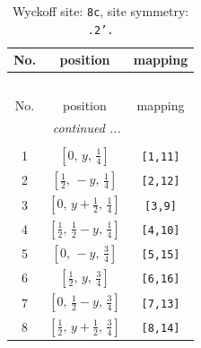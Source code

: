 \documentclass[fleqn,8pt]{jsarticle}
\begin{document}
\begin{longtable}{ccc}
\caption{Wyckoff site: {\tt 8c}, site symmetry: {\tt .2'.}}
 \\
 \hline \hline
No. & position & mapping \\ \hline \endfirsthead

\multicolumn{2}{l}{\tablename\ \thetable{}} \\
 \hline \hline
No. & position & mapping \\ \hline \endhead

 \hline \hline
\multicolumn{2}{r}{\footnotesize\it continued ...} \\ \endfoot

 \hline \hline
\multicolumn{2}{r}{} \\ \endlastfoot

1 & $\left[ 0,\, y,\, \frac{1}{4} \right]$ & {\tt [1,11]} \\ \hline
2 & $\left[ \frac{1}{2},\, - y,\, \frac{1}{4} \right]$ & {\tt [2,12]} \\ \hline
3 & $\left[ 0,\, y + \frac{1}{2},\, \frac{1}{4} \right]$ & {\tt [3,9]} \\ \hline
4 & $\left[ \frac{1}{2},\, \frac{1}{2} - y,\, \frac{1}{4} \right]$ & {\tt [4,10]} \\ \hline
5 & $\left[ 0,\, - y,\, \frac{3}{4} \right]$ & {\tt [5,15]} \\ \hline
6 & $\left[ \frac{1}{2},\, y,\, \frac{3}{4} \right]$ & {\tt [6,16]} \\ \hline
7 & $\left[ 0,\, \frac{1}{2} - y,\, \frac{3}{4} \right]$ & {\tt [7,13]} \\ \hline
8 & $\left[ \frac{1}{2},\, y + \frac{1}{2},\, \frac{3}{4} \right]$ & {\tt [8,14]} \\
\end{longtable}
\renewcommand{\arraystretch}{1.2}
\end{document}
